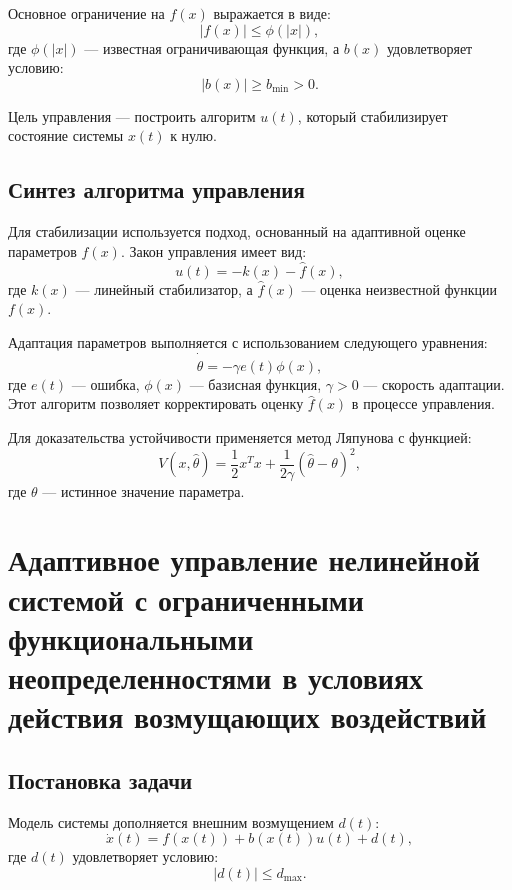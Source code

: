 \documentclass[a4paper,14pt]{extarticle} %
\begin{document}
Основное ограничение на $f(x)$ выражается в виде:
\begin{equation}
|f(x)| \leq \phi(|x|),
\end{equation}
где $\phi(|x|)$ — известная ограничивающая функция, а $b(x)$ удовлетворяет условию:
\begin{equation}
|b(x)| \geq b_{\text{min}} > 0.
\end{equation}

Цель управления — построить алгоритм $u(t)$, который стабилизирует состояние системы $x(t)$ к нулю.

\subsection*{Синтез алгоритма управления}
Для стабилизации используется подход, основанный на адаптивной оценке параметров $f(x)$. Закон управления имеет вид:
\begin{equation}
u(t) = -k(x) - \hat{f}(x),
\end{equation}
где $k(x)$ — линейный стабилизатор, а $\hat{f}(x)$ — оценка неизвестной функции $f(x)$.

Адаптация параметров выполняется с использованием следующего уравнения:
\begin{equation}
\dot{\hat{\theta}} = -\gamma e(t)\phi(x),
\end{equation}
где $e(t)$ — ошибка, $\phi(x)$ — базисная функция, $\gamma > 0$ — скорость адаптации. Этот алгоритм позволяет корректировать оценку $\hat{f}(x)$ в процессе управления.

Для доказательства устойчивости применяется метод Ляпунова с функцией:
\begin{equation}
V(x, \hat{\theta}) = \frac{1}{2}x^T x + \frac{1}{2\gamma} (\hat{\theta} - \theta)^2,
\end{equation}
где $\theta$ — истинное значение параметра.

\newpage
\section{Адаптивное управление нелинейной системой с ограниченными функциональными неопределенностями в условиях действия возмущающих воздействий}
\subsection*{Постановка задачи}
Модель системы дополняется внешним возмущением $d(t)$:
\begin{equation}
\dot{x}(t) = f(x(t)) + b(x(t))u(t) + d(t),
\end{equation}
где $d(t)$ удовлетворяет условию:
\begin{equation}
|d(t)| \leq d_{\text{max}}.
\end{equation}
\end{document}
